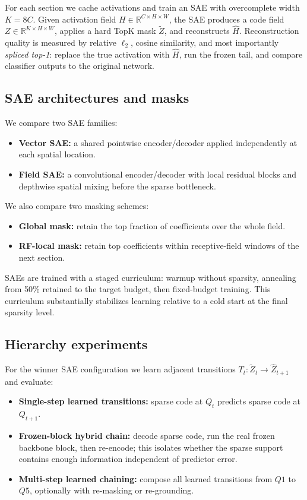 \documentclass[10pt,twocolumn]{article}
\begin{document}
For each section we cache activations and train an SAE with overcomplete width $K = 8C$. Given activation field $H \in \mathbb{R}^{C \times H \times W}$, the SAE produces a code field $Z \in \mathbb{R}^{K \times H \times W}$, applies a hard TopK mask $\tilde{Z}$, and reconstructs $\hat{H}$. Reconstruction quality is measured by relative $\ell_2$, cosine similarity, and most importantly \emph{spliced top-1}: replace the true activation with $\hat{H}$, run the frozen tail, and compare classifier outputs to the original network.

\subsection{SAE architectures and masks}
We compare two SAE families:
\begin{itemize}[leftmargin=1.2em]
  \item \textbf{Vector SAE:} a shared pointwise encoder/decoder applied independently at each spatial location.
  \item \textbf{Field SAE:} a convolutional encoder/decoder with local residual blocks and depthwise spatial mixing before the sparse bottleneck.
\end{itemize}

We also compare two masking schemes:
\begin{itemize}[leftmargin=1.2em]
  \item \textbf{Global mask:} retain the top fraction of coefficients over the whole field.
  \item \textbf{RF-local mask:} retain top coefficients within receptive-field windows of the next section.
\end{itemize}

SAEs are trained with a staged curriculum: warmup without sparsity, annealing from 50\% retained to the target budget, then fixed-budget training. This curriculum substantially stabilizes learning relative to a cold start at the final sparsity level.

\subsection{Hierarchy experiments}
For the winner SAE configuration we learn adjacent transitions $T_t: \tilde{Z}_t \rightarrow \hat{Z}_{t+1}$ and evaluate:
\begin{itemize}[leftmargin=1.2em]
  \item \textbf{Single-step learned transitions:} sparse code at $Q_t$ predicts sparse code at $Q_{t+1}$.
  \item \textbf{Frozen-block hybrid chain:} decode sparse code, run the real frozen backbone block, then re-encode; this isolates whether the sparse support contains enough information independent of predictor error.
  \item \textbf{Multi-step learned chaining:} compose all learned transitions from $Q1$ to $Q5$, optionally with re-masking or re-grounding.
\end{itemize}
\end{document}

